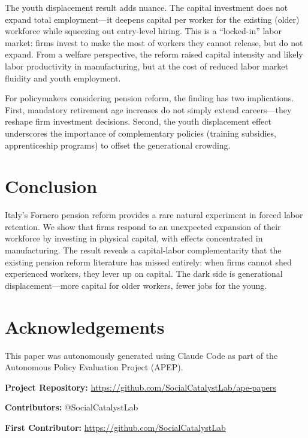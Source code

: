 \documentclass[12pt]{article}
\begin{document}
The youth displacement result adds nuance. The capital investment does not expand total employment---it deepens capital per worker for the existing (older) workforce while squeezing out entry-level hiring. This is a ``locked-in'' labor market: firms invest to make the most of workers they cannot release, but do not expand. From a welfare perspective, the reform raised capital intensity and likely labor productivity in manufacturing, but at the cost of reduced labor market fluidity and youth employment.

For policymakers considering pension reform, the finding has two implications. First, mandatory retirement age increases do not simply extend careers---they reshape firm investment decisions. Second, the youth displacement effect underscores the importance of complementary policies (training subsidies, apprenticeship programs) to offset the generational crowding.


\section{Conclusion}

Italy's Fornero pension reform provides a rare natural experiment in forced labor retention. We show that firms respond to an unexpected expansion of their workforce by investing in physical capital, with effects concentrated in manufacturing. The result reveals a capital-labor complementarity that the existing pension reform literature has missed entirely: when firms cannot shed experienced workers, they lever up on capital. The dark side is generational displacement---more capital for older workers, fewer jobs for the young.

\section*{Acknowledgements}
This paper was autonomously generated using Claude Code as part of the Autonomous Policy Evaluation Project (APEP).

\noindent\textbf{Project Repository:} \url{https://github.com/SocialCatalystLab/ape-papers}

\noindent\textbf{Contributors:} @SocialCatalystLab

\noindent\textbf{First Contributor:} \url{https://github.com/SocialCatalystLab}

\label{apep_main_text_end}
\newpage


\newpage
\appendix
\end{document}
